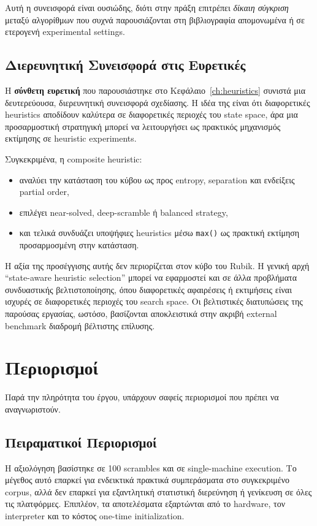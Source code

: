 Αυτή η συνεισφορά είναι ουσιώδης, διότι στην πράξη επιτρέπει \emph{δίκαιη σύγκριση} μεταξύ αλγορίθμων που συχνά παρουσιάζονται στη βιβλιογραφία απομονωμένα ή σε ετερογενή experimental settings.

\subsection{Διερευνητική Συνεισφορά στις Ευρετικές}

Η \textbf{σύνθετη ευρετική} που παρουσιάστηκε στο Κεφάλαιο~\ref{ch:heuristics}
συνιστά μια δευτερεύουσα, διερευνητική συνεισφορά σχεδίασης. Η ιδέα της είναι
ότι διαφορετικές heuristics αποδίδουν καλύτερα σε διαφορετικές περιοχές του
state space, άρα μια προσαρμοστική στρατηγική μπορεί να λειτουργήσει ως
πρακτικός μηχανισμός εκτίμησης σε heuristic experiments.

Συγκεκριμένα, η composite heuristic:
\begin{itemize}
    \item αναλύει την κατάσταση του κύβου ως προς entropy, separation και ενδείξεις partial order,
    \item επιλέγει near-solved, deep-scramble ή balanced strategy,
    \item και τελικά συνδυάζει υποψήφιες heuristics μέσω \texttt{max()} ως πρακτική εκτίμηση προσαρμοσμένη στην κατάσταση.
\end{itemize}

Η αξία της προσέγγισης αυτής δεν περιορίζεται στον κύβο του Rubik. Η γενική
αρχή ``state-aware heuristic selection'' μπορεί να εφαρμοστεί και σε άλλα
προβλήματα συνδυαστικής βελτιστοποίησης, όπου διαφορετικές αφαιρέσεις ή
εκτιμήσεις είναι ισχυρές σε διαφορετικές περιοχές του search space. Οι
βελτιστικές διατυπώσεις της παρούσας εργασίας, ωστόσο, βασίζονται αποκλειστικά
στην ακριβή external benchmark διαδρομή βέλτιστης επίλυσης.

\section{Περιορισμοί}

Παρά την πληρότητα του έργου, υπάρχουν σαφείς περιορισμοί που πρέπει να αναγνωριστούν.

\subsection{Πειραματικοί Περιορισμοί}

Η αξιολόγηση βασίστηκε σε 100 scrambles και σε single-machine execution. Το μέγεθος αυτό επαρκεί για ενδεικτικά πρακτικά συμπεράσματα στο συγκεκριμένο corpus, αλλά δεν επαρκεί για εξαντλητική στατιστική διερεύνηση ή γενίκευση σε όλες τις πλατφόρμες. Επιπλέον, τα αποτελέσματα εξαρτώνται από το hardware, τον interpreter και το κόστος one-time initialization.

